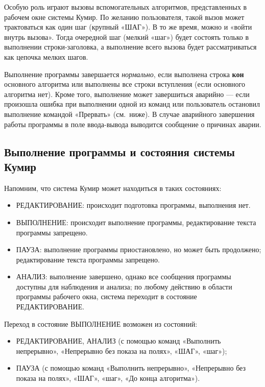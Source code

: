\documentclass[12pt,a4paper]{article}
\begin{document}
Особую роль играют вызовы вспомогательных алгоритмов, представленных в рабочем окне системы Кумир. По желанию пользователя, такой вызов может трактоваться как один шаг (крупный «ШАГ»). В то же время, можно и «войти внутрь вызова». Тогда очередной шаг (мелкий «шаг») будет состоять только в выполнении строки-заголовка, а выполнение всего вызова будет рассматриваться как цепочка мелких шагов. 

Выполнение программы завершается \emph{нормально}, если выполнена строка \textsf{\textbf{кон}} основного алгоритма или выполнены все строки вступления (если основного алгоритма нет). Кроме того, выполнение может завершиться аварийно --- если произошла ошибка при выполнении одной из команд или пользователь остановил выполнение командой «Прервать» (см.~ниже). В случае аварийного завершения работы программы в поле ввода-вывода выводится сообщение о причинах аварии.

\subsection{Выполнение программы и состояния системы Кумир}

Напомним, что система Кумир может находиться в таких состояниях:
\begin{itemize}
\item РЕДАКТИРОВАНИЕ: происходит подготовка программы, выполнения нет.
\item ВЫПОЛНЕНИЕ:  происходит выполнение программы, редактирование текста программы запрещено.
\item ПАУЗА: выполнение программы приостановлено, но может быть продолжено; редактирование текста программы запрещено.
\item АНАЛИЗ: выполнение завершено, однако все сообщения программы доступны для наблюдения и анализа; по любому действию в области программы рабочего окна, система переходит в состояние РЕДАКТИРОВАНИЕ.
\end{itemize}

Переход в состояние ВЫПОЛНЕНИЕ возможен из состояний:
\begin{itemize}
\item РЕДАКТИРОВАНИЕ, АНАЛИЗ (с помощью команд «Выполнить непрерывно», «Неп\-ре\-рыв\-но без показа на полях», «ШАГ», «шаг»);
\item ПАУЗА (с помощью команд «Выполнить непрерывно», «Непрерывно без показа на полях», «ШАГ», «шаг», «До конца алгоритма»).
\end{itemize}
\end{document}
